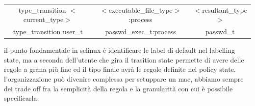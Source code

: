 \documentclass[12pt, oneside]{extbook} %
\begin{document}
\begin{table}[!h]
	\begin{tabular}{c c c}
		type\_transition $<$current\_type$>$ & $<$executable\_file\_type$>$:process & $<$resultant\_type$>$\\
		type\_transition user\_t & passwd\_exec\_t:process & passwd\_t\\
	\end{tabular}
\end{table}
il punto fondamentale in selinux è identificare le label di default nel labelling state, ma a seconda dell'utente che gira il trasition state permette di avere delle regole a grana più fine ed il tipo finale avrà le regole definite nel policy state.\\l'organizzazione può divenire complessa per setuppare un mac, abbiamo sempre dei trade off fra la semplicità della regola e la granularità con cui è possibile specificarla.
\end{document}
